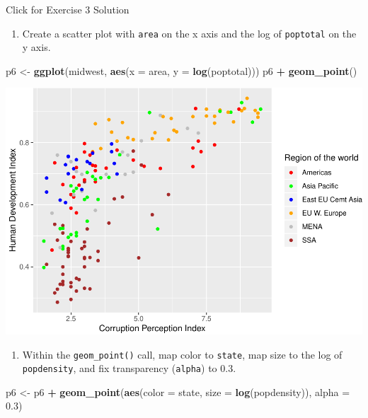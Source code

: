 \documentclass[]{book}
\newenvironment{Shaded}{\begin{snugshade}}{\end{snugshade}}
\newcommand{\DataTypeTok}[1]{\textcolor[rgb]{0.13,0.29,0.53}{#1}}
\newcommand{\FloatTok}[1]{\textcolor[rgb]{0.00,0.00,0.81}{#1}}
\newcommand{\KeywordTok}[1]{\textcolor[rgb]{0.13,0.29,0.53}{\textbf{#1}}}
\newcommand{\NormalTok}[1]{#1}
\newcommand{\OperatorTok}[1]{\textcolor[rgb]{0.81,0.36,0.00}{\textbf{#1}}}
\newcommand{\StringTok}[1]{\textcolor[rgb]{0.31,0.60,0.02}{#1}}
\providecommand{\tightlist}{%
  \setlength{\itemsep}{0pt}\setlength{\parskip}{0pt}}
\begin{document}
{Click for Exercise 3 Solution}

\begin{enumerate}
\def\labelenumi{\arabic{enumi}.}
\tightlist
\item
  Create a scatter plot with \texttt{area} on the x axis and the log of \texttt{poptotal} on the y axis.
\end{enumerate}

\begin{Shaded}
\begin{Highlighting}[]
\NormalTok{p6 <-}\StringTok{ }\KeywordTok{ggplot}\NormalTok{(midwest, }\KeywordTok{aes}\NormalTok{(}\DataTypeTok{x =}\NormalTok{ area, }\DataTypeTok{y =} \KeywordTok{log}\NormalTok{(poptotal))) }
\NormalTok{p6 }\OperatorTok{+}\StringTok{ }\KeywordTok{geom_point}\NormalTok{() }
\end{Highlighting}
\end{Shaded}

\includegraphics{R/Rgraphics/figures/unnamed-chunk-209-1.pdf}

\begin{enumerate}
\def\labelenumi{\arabic{enumi}.}
\setcounter{enumi}{1}
\tightlist
\item
  Within the \texttt{geom\_point()} call, map color to \texttt{state}, map size to the log of \texttt{popdensity}, and fix transparency (\texttt{alpha}) to 0.3.
\end{enumerate}

\begin{Shaded}
\begin{Highlighting}[]
\NormalTok{p6 <-}\StringTok{ }\NormalTok{p6 }\OperatorTok{+}\StringTok{ }\KeywordTok{geom_point}\NormalTok{(}\KeywordTok{aes}\NormalTok{(}\DataTypeTok{color =}\NormalTok{ state, }\DataTypeTok{size =} \KeywordTok{log}\NormalTok{(popdensity)), }\DataTypeTok{alpha =} \FloatTok{0.3}\NormalTok{) }
\end{Highlighting}
\end{Shaded}
\end{document}

